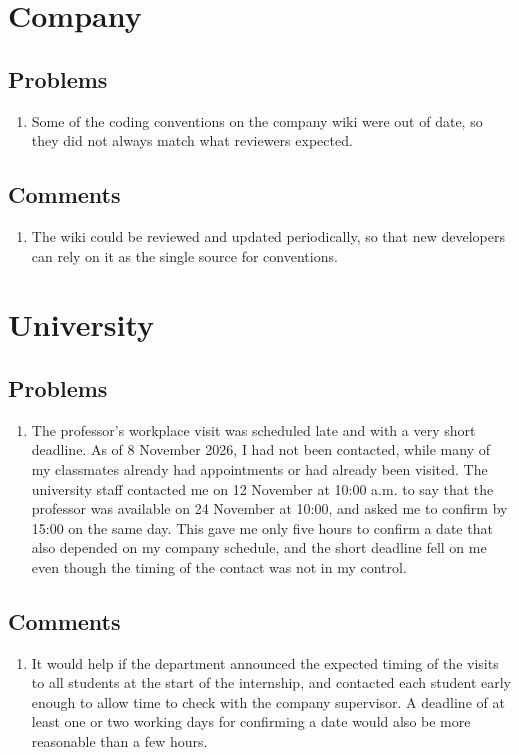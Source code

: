 \pagebreak
\section{Company}
\subsection{Problems}
\begin{enumerate}[label=\arabic*.]
    \item Some of the coding conventions on the company wiki were out of date, so they did not always match what reviewers expected.
\end{enumerate}

\subsection{Comments}
\begin{enumerate}[label=\arabic*.]
    \item The wiki could be reviewed and updated periodically, so that new developers can rely on it as the single source for conventions.
\end{enumerate}

\section{University}
\subsection{Problems}
\begin{enumerate}[label=\arabic*.]
    \item The professor's workplace visit was scheduled late and with a very short deadline. As of 8 November 2026, I had not been contacted, while many of my classmates already had appointments or had already been visited. The university staff contacted me on 12 November at 10:00 a.m. to say that the professor was available on 24 November at 10:00, and asked me to confirm by 15:00 on the same day. This gave me only five hours to confirm a date that also depended on my company schedule, and the short deadline fell on me even though the timing of the contact was not in my control.
\end{enumerate}

\subsection{Comments}
\begin{enumerate}[label=\arabic*.]
    \item It would help if the department announced the expected timing of the visits to all students at the start of the internship, and contacted each student early enough to allow time to check with the company supervisor. A deadline of at least one or two working days for confirming a date would also be more reasonable than a few hours.
\end{enumerate}